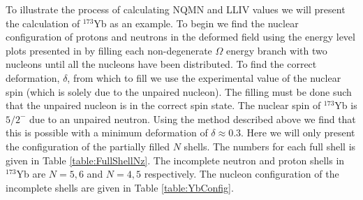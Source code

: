 \documentclass[8pt,a4paper, twoside]{report}
\begin{document}
To illustrate the process of calculating NQMN and LLIV values we will present the calculation of $^{173}$Yb as an example. To begin we find the nuclear configuration of protons and neutrons in the deformed field using the energy level plots presented in \cite{Nilsson1955,BohrMottVol2} by filling each non-degenerate $\Omega$ energy branch with two nucleons until all the nucleons have been distributed. To find the correct deformation, $\delta$, from which to fill we use the experimental value of the nuclear spin (which is solely due to the unpaired nucleon). The filling must be done such that the unpaired nucleon is in the correct spin state. The nuclear spin of $^{173}$Yb is $5/2^{-}$ due to an unpaired neutron. Using the method described above we find that this is possible with a minimum deformation of $\delta \approx 0.3$. Here we will only present the configuration of the partially filled $N$ shells. The numbers for each full shell is given in Table \ref{table:FullShellNz}. The incomplete neutron and proton shells in $^{173}$Yb are $N = 5,6$ and $N = 4,5$ respectively. The nucleon configuration of the incomplete shells are given in Table \ref{table:YbConfig}.
\end{document}
